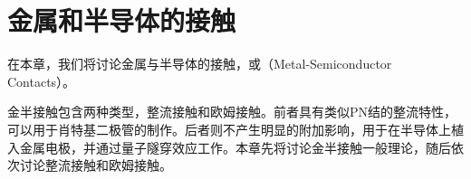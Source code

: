 \chapter{金属和半导体的接触}
在本章，我们将讨论金属与半导体的接触，或（Metal-Semiconductor Contacts）。

金半接触包含两种类型，整流接触和欧姆接触。前者具有类似PN结的整流特性，可以用于肖特基二极管的制作。后者则不产生明显的附加影响，用于在半导体上植入金属电极，并通过量子隧穿效应工作。本章先将讨论金半接触一般理论，随后依次讨论整流接触和欧姆接触。

